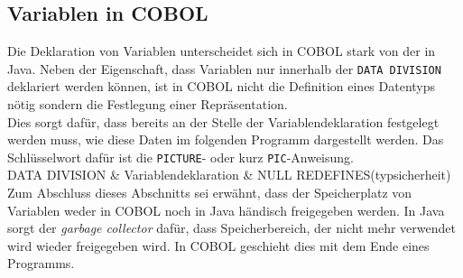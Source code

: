 \subsection*{Variablen in COBOL}
Die Deklaration von Variablen unterscheidet sich in COBOL stark von der in Java. Neben der Eigenschaft, dass Variablen nur innerhalb der \texttt{DATA DIVISION} deklariert werden können, ist in COBOL nicht die Definition eines Datentyps nötig sondern die Festlegung einer Repräsentation. \\

Dies sorgt dafür, dass bereits an der Stelle der Variablendeklaration festgelegt werden muss, wie diese Daten im folgenden Programm dargestellt werden. Das Schlüsselwort dafür ist die \texttt{PICTURE}- oder kurz \texttt{PIC}-Anweisung.\\



DATA DIVISION \& Variablendeklaration \& NULL REDEFINES(typsicherheit)\\


Zum Abschluss dieses Abschnitts sei erwähnt, dass der Speicherplatz von Variablen weder in COBOL noch in Java händisch freigegeben werden. In Java sorgt der \textit{garbage collector} dafür, dass Speicherbereich, der nicht mehr verwendet wird wieder freigegeben wird. In COBOL geschieht dies mit dem Ende eines Programms.\\